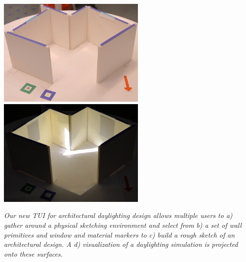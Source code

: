 \documentclass[landscape,20pt]{sciposter}
\begin{document}
\begin{minipage}[b]{12.15in}
\begin{minipage}[b]{4in}
\includegraphics[width=2.85in]{../gi2012_userstudy/images/photos/sample_model}
\includegraphics[width=2.85in]{../gi2012_userstudy/images/photos/sample_rendering}
\end{minipage}

\vspace{0.25in}  {\em Our new TUI for architectural daylighting design allows
    multiple users to a) gather around a physical sketching
    environment and select from b) a set of wall primitives and window
    and material markers to c) build a rough sketch of an
    architectural design.  A d) visualization of a daylighting
    simulation is projected onto these surfaces. }
\end{minipage}
\hfill
%
\end{document}
